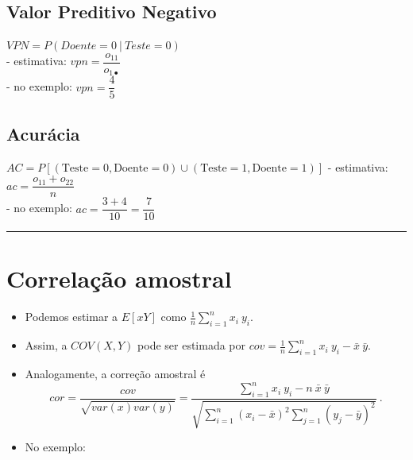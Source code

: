 \documentclass[
]{book}
\newenvironment{Shaded}{\begin{snugshade}}{\end{snugshade}}
\newcommand{\FunctionTok}[1]{\textcolor[rgb]{0.13,0.29,0.53}{\textbf{#1}}}
\newcommand{\NormalTok}[1]{#1}
\newcommand{\SpecialCharTok}[1]{\textcolor[rgb]{0.81,0.36,0.00}{\textbf{#1}}}
\begin{document}
\subsection{Valor Preditivo Negativo}\label{valor-preditivo-negativo}

\(VPN = P(Doente=0~|~Teste=0)\)\\
- estimativa: \(vpn = \dfrac{o_{11}}{o_{1 \bullet}}\)\\
- no exemplo: \(vpn = \dfrac{4}{5}\)

\subsection{Acurácia}\label{acuruxe1cia}

\(AC = P\left[(\text{Teste}=0, \text{Doente} = 0) \cup (\text{Teste}=1, \text{Doente} = 1)\right]\)
- estimativa: \(ac = \dfrac{o_{11}+o_{22}}{n}\)\\
- no exemplo: \(ac = \dfrac{3+4}{10} = \dfrac{7}{10}\)

\begin{center}\rule{0.5\linewidth}{0.5pt}\end{center}

\section{Correlação amostral}\label{correlauxe7uxe3o-amostral}

\begin{itemize}
\item
  Podemos estimar a \(E[xY]\) como \(\displaystyle \frac{1}{n}\sum_{i=1}^n x_i~y_i\).
\item
  Assim, a \(COV(X,Y)\) pode ser estimada por \(\displaystyle cov = \frac{1}{n}\sum_{i=1}^n x_i~y_i - \bar{x}~\bar{y}\).
\item
  Analogamente, a correção amostral é \[cor = \dfrac{cov}{\sqrt{var(x)var(y)}} = \dfrac{\displaystyle \sum_{i=1}^n x_i~y_i - n~\bar{x}~\bar{y}}{\displaystyle \sqrt{\sum_{i=1}^n (x_i-\bar{x})^2\sum_{j=1}^n(y_j-\bar{y})^2}}~.\]
\item
  No exemplo:
\end{itemize}

\begin{Shaded}
\end{Shaded}
\end{document}
